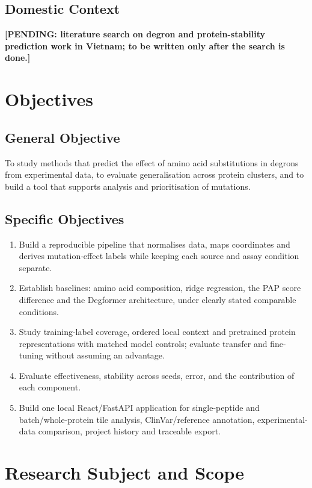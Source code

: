 \subsection{Domestic Context}
\textbf{[PENDING: literature search on degron and protein-stability prediction work in Vietnam; to be
written only after the search is done.]}

\section{Objectives}
\subsection{General Objective}
To study methods that predict the effect of amino acid substitutions in degrons from experimental data,
to evaluate generalisation across protein clusters, and to build a tool that supports analysis and
prioritisation of mutations.

\subsection{Specific Objectives}
\begin{enumerate}
  \item Build a reproducible pipeline that normalises data, maps coordinates and derives mutation-effect
        labels while keeping each source and assay condition separate.
  \item Establish baselines: amino acid composition, ridge regression, the PAP score difference and the
        Degformer architecture, under clearly stated comparable conditions.
  \item Study training-label coverage, ordered local context and pretrained protein representations
        with matched model controls; evaluate transfer and fine-tuning without assuming an advantage.
  \item Evaluate effectiveness, stability across seeds, error, and the contribution of each component.
  \item Build one local React/FastAPI application for single-peptide and batch/whole-protein tile analysis,
        ClinVar/reference annotation, experimental-data comparison, project history and traceable export.
\end{enumerate}

\section{Research Subject and Scope}

